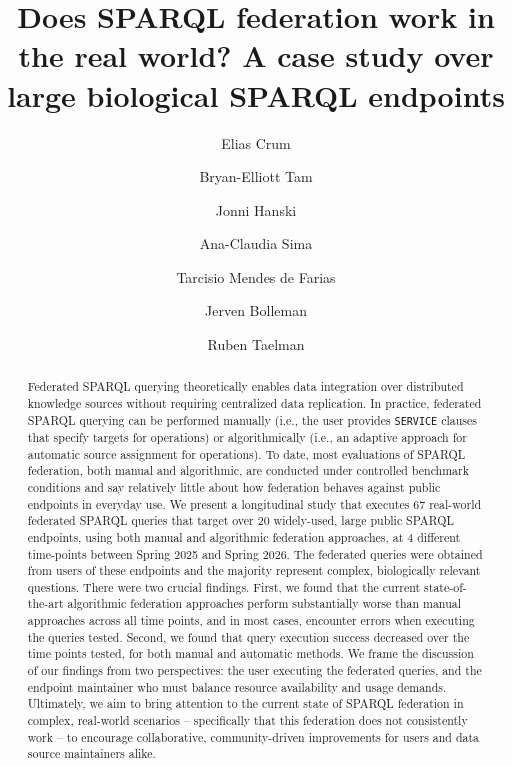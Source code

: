 \documentclass[runningheads]{llncs}
\title{Does SPARQL federation work in the real world? A case study over large biological SPARQL endpoints}
\author{Elias Crum\inst{1} \and
Bryan-Elliott Tam\inst{1} \and
Jonni Hanski\inst{1} \and
Ana-Claudia Sima \inst{2} \and
Tarcisio Mendes de Farias \inst{2} \and
Jerven Bolleman \inst{3} \and
Ruben Taelman\inst{1}
}
\institute{IDLab, Ghent University -- imec, Belgium \and
SIB Swiss Institute of Bioinformatics, Lausanne, Switzerland \and
Swiss-Prot group, SIB Swiss Institute of Bioinformatics, Geneva, Switzerland}
\begin{document}
\maketitle

\begin{abstract}
Federated SPARQL querying theoretically enables data integration over distributed knowledge sources without requiring centralized data replication.
In practice, federated SPARQL querying can be performed manually (i.e., the user provides \texttt{SERVICE} clauses that specify targets for operations) or algorithmically (i.e., an adaptive approach for automatic source assignment for operations).
To date, most evaluations of SPARQL federation, both manual and algorithmic, are conducted under controlled benchmark conditions and say relatively little about how federation behaves against public endpoints in everyday use. 
We present a longitudinal study that executes 67 real-world federated SPARQL queries that target over 20 widely-used, large public SPARQL endpoints, using both manual and algorithmic federation approaches, at 4 different time-points between Spring 2025 and Spring 2026.
The federated queries were obtained from users of these endpoints and the majority represent complex, biologically relevant questions.
There were two crucial findings. 
First, we found that the current state-of-the-art algorithmic federation approaches perform substantially worse than manual approaches across all time points, and in most cases, encounter errors when executing the queries tested.
Second, we found that query execution success decreased over the time points tested, for both manual and automatic methods.
We frame the discussion of our findings from two perspectives: the user executing the federated queries, and the endpoint maintainer who must balance resource availability and usage demands.
Ultimately, we aim to bring attention to the current state of SPARQL federation in complex, real-world scenarios -- specifically that this federation does not consistently work -- to encourage collaborative, community-driven improvements for users and data source maintainers alike.

\end{abstract}
\end{document}
